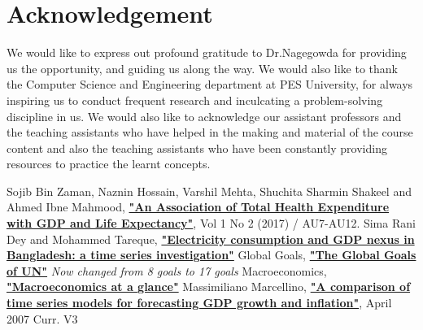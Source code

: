 \documentclass[conference]{IEEEtran}
\begin{document}
\section{Acknowledgement}
We would like to express out profound gratitude to Dr.Nagegowda for providing us the opportunity, and guiding us along the way.
We would also like to thank the Computer Science and Engineering department at PES University, for always inspiring us to conduct frequent research and inculcating a problem-solving discipline in us.
We would also like to acknowledge our assistant professors and the teaching assistants who have helped in the making and material of the course content and also the teaching assistants who have been constantly providing resources to practice the learnt concepts.
\begin{thebibliography}{00}
     Sojib Bin Zaman, Naznin Hossain, Varshil Mehta, Shuchita Sharmin Shakeel and Ahmed Ibne Mahmood, \textbf{\href{https://jmrionline.com/jmri/article/view/72/86}{"An Association of Total Health Expenditure with GDP and Life Expectancy"}}, Vol 1 No 2 (2017) / AU7-AU12.
     Sima Rani Dey and Mohammed Tareque, \textbf{\href{https://www.emerald.com/insight/content/doi/10.1108/JABES-04-2019-0029/full/pdf}{"Electricity consumption and GDP nexus in Bangladesh: a time series investigation"}}
     Global Goals, \textbf{\href{https://www.globalgoals.org/goals/}{"The Global Goals of UN"}} \emph{Now changed from 8 goals to 17 goals}
     Macroeconomics, \textbf{\href{https://www.worldbank.org/en/topic/macroeconomics/overview}{"Macroeconomics at a glance"}}
     Massimiliano Marcellino, \textbf{\href{https://www.researchgate.net/profile/Niels-Haldrup/publication/228650389_A_comparison_of_time_series_models_for_forecasting_GDP_growth_and_inflation/links/0c96051b6b0d0e7951000000/A-comparison-of-time-series-models-for-forecasting-GDP-growth-and-inflation.pdf}{"A comparison of time series models for forecasting GDP growth and inflation"}}, April 2007 Curr. V3
\end{thebibliography}
\end{document}
